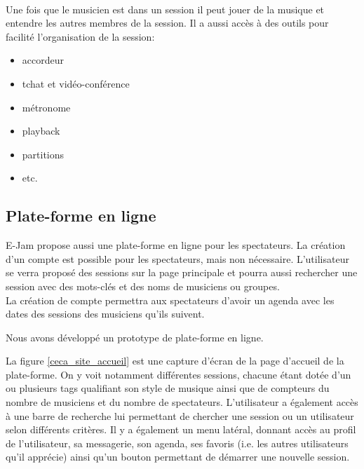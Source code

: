 \documentclass[a4,12pt]{article}
\begin{document}
\begin{itemize}
    \\
    Une fois que le musicien est dans un session il peut jouer de la musique et entendre les autres membres de la session. Il a aussi accès à des outils pour facilité l’organisation de la session:
    \begin{itemize}
        \item accordeur
        \item tchat et vidéo-conférence
        \item métronome
        \item playback
        \item partitions
        \item etc.
    \end{itemize}
\end{itemize}

\subsection{Plate-forme en ligne}
E-Jam propose aussi une plate-forme en ligne pour les spectateurs. La création d'un compte est possible pour les spectateurs, mais non nécessaire. L’utilisateur se verra proposé des sessions sur la page principale et pourra aussi rechercher une session avec des mots-clés et des noms de musiciens ou groupes.\\
La création de compte permettra aux spectateurs d’avoir un agenda avec les dates des sessions des musiciens qu’ils suivent.

Nous avons développé un prototype de plate-forme en ligne.

La figure \ref{ceca_site_accueil} est une capture d'écran de la page d'accueil de
la plate-forme. On y voit notamment différentes sessions, chacune étant dotée d'un
ou plusieurs tags qualifiant son style de musique ainsi que de compteurs du nombre
de musiciens et du nombre de spectateurs. L'utilisateur a également accès à une
barre de recherche lui permettant de chercher une session ou un utilisateur selon
différents critères. Il y a également un menu latéral, donnant accès au profil de
l'utilisateur, sa messagerie, son agenda, ses favoris (i.e. les autres utilisateurs
qu'il apprécie) ainsi qu'un bouton permettant de démarrer une nouvelle session.
\end{document}
